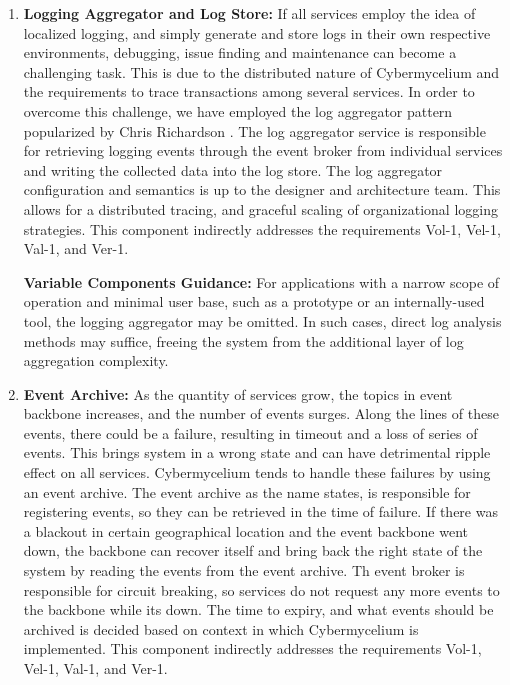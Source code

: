 \documentclass[review]{elsarticle}
\begin{document}
\begin{enumerate}
    \item \textbf{Logging Aggregator and Log Store:} If all services employ the idea of localized logging, and simply generate and store logs in their own respective environments, debugging, issue finding and maintenance can become a challenging task. This is due to the distributed nature of Cybermycelium and the requirements to trace transactions among several services. In order to overcome this challenge, we have employed the log aggregator pattern popularized by Chris Richardson \cite{MicroServicesPatterns}. The log aggregator service is responsible for retrieving logging events through the event broker from individual services and writing the collected data into the log store. The log aggregator configuration and semantics is up to the designer and architecture team. This allows for a distributed tracing, and graceful scaling of organizational logging strategies. This component indirectly addresses the requirements Vol-1, Vel-1, Val-1, and Ver-1.
    
    \textbf{Variable Components Guidance:} For applications with a narrow scope of operation and minimal user base, such as a prototype or an internally-used tool, the logging aggregator may be omitted. In such cases, direct log analysis methods may suffice, freeing the system from the additional layer of log aggregation complexity.

    \item \textbf{Event Archive:} As the quantity of services grow, the topics in event backbone increases, and the number of events surges. Along the lines of these events, there could be a failure, resulting in timeout and a loss of series of events. This brings system in a wrong state and can have detrimental ripple effect on all services. Cybermycelium tends to handle these failures by using an event archive. The event archive as the name states, is responsible for registering events, so they can be retrieved in the time of failure. If there was a blackout in certain geographical location and the event backbone went down, the backbone can recover itself and bring back the right state of the system by reading the events from the event archive. Th event broker is responsible for circuit breaking, so services do not request any more events to the backbone while its down. The time to expiry, and what events should be archived is decided based on context in which Cybermycelium is implemented. This component indirectly addresses
    the requirements Vol-1, Vel-1, Val-1, and Ver-1.


\end{enumerate}
\end{document}

